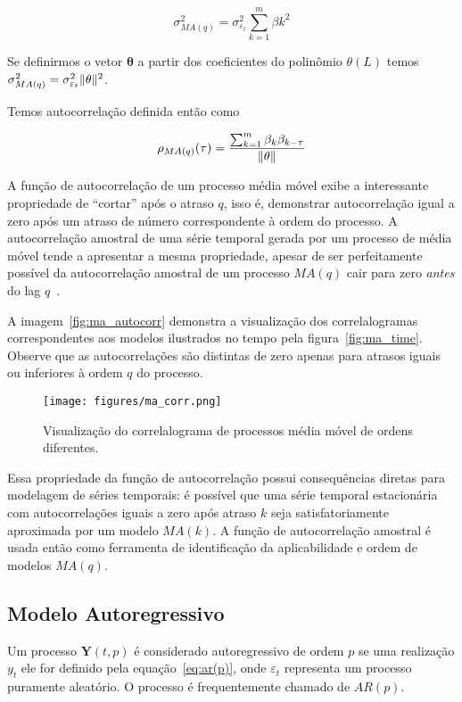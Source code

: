 $$\sigma^{2}_{MA(q)} = \sigma_{\varepsilon_t}^2 \sum^{m}_{k=1} \beta{k}^2 $$

Se definirmos o vetor $\mathbf{\theta}$ a partir dos coeficientes do polinômio
$\theta(L)$ temos $\sigma^{2}_{MA(q)} = \sigma_{\varepsilon_t}^2\lVert\mathbf{\theta}\rVert^2$.

Temos autocorrelação definida então como

$$\rho_{MA(q)}(\tau) = \frac{\sum^{m}_{k=1} \beta_k\beta_{k-\tau}}{\lVert\mathbf{\theta}\rVert}$$

A função de autocorrelação de um processo média móvel exibe a interessante
propriedade de ``cortar'' após o atraso $q$, isso é, demonstrar autocorrelação
igual a zero após um atraso de número correspondente à ordem do processo. A
autocorrelação amostral de uma série temporal gerada por um processo de média
móvel tende a apresentar a mesma propriedade, apesar de ser perfeitamente
possível da autocorrelação amostral de um processo $MA(q)$ cair para zero
\emph{antes} do lag $q$~\cite{chatfield}.

A imagem~\ref{fig:ma_autocorr} demonstra a visualização dos correlalogramas
correspondentes aos modelos ilustrados no tempo pela figura~\ref{fig:ma_time}.
Observe que as autocorrelações são distintas de zero apenas para atrasos
iguais ou inferiores à ordem $q$ do processo.

\begin{figure}[H]
    \centering
    \texttt{[image: figures/ma\_corr.png]}
    \caption{Visualização do correlalograma de processos média móvel de ordens
    diferentes.}
    \label{fig:ma_corr}
\end{figure}

Essa propriedade da função de autocorrelação possui consequências diretas para
modelagem de séries temporais: é possível que uma série temporal estacionária
com autocorrelações iguais a zero após atraso $k$ seja satisfatoriamente
aproximada por um modelo $MA(k)$. A função de autocorrelação amostral é usada
então como ferramenta de identificação da aplicabilidade e ordem de modelos
$MA(q)$.

\subsection{Modelo Autoregressivo}
\label{ssec:AR(p)}

Um processo ${\mathbf{Y}(t, p)}$ é considerado autoregressivo de ordem $p$ se
uma realização $y_t$ ele for definido pela equação~\ref{eq:ar(p)}, onde
$\varepsilon_t$ representa um processo puramente aleatório. O processo é
frequentemente chamado de $AR(p)$.

